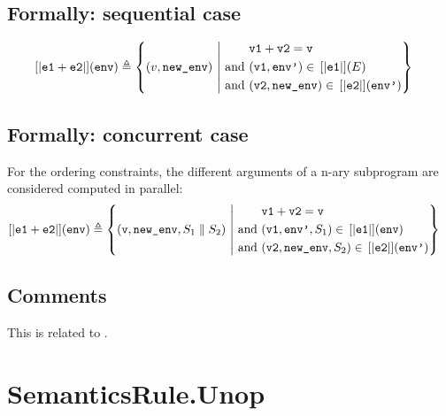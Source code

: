 \documentclass{book}
\begin{document}
\begin{formal}
  \subsection{Formally: sequential case}

  \begin{align}
  \left[| \texttt{e1} + \texttt{e2} \right|] (\texttt{env}) & \triangleq
    \left\{ (v, \texttt{new\_env}) \ \middle|\ {}
    \begin{aligned}
      & \texttt{v1} + \texttt{v2} = \texttt{v}
      \\ \text{and}\ &
      (\texttt{v1}, \texttt{env'}) \in{} \left[| \texttt{e1} \right|] (E)
      \\ \text{and}\ &
      (\texttt{v2}, \texttt{new\_env}) \in{} \left[| \texttt{e2} \right|] (\texttt{env'})
    \end{aligned}
    \right\}
  \label{eq:sem-seq-plus}
  \end{align}

  \subsection{Formally: concurrent case}
  For the ordering constraints, the different arguments of a n-ary subprogram
are considered computed in parallel:
  \begin{align}
    \left[| \texttt{e1} + \texttt{e2} \right|] (\texttt{env}) & \triangleq
    \left\{ (\texttt{v}, \texttt{new\_env}, S_1 \parallel S_2) \ \middle|\ {}
    \begin{aligned}
      & \texttt{v1} + \texttt{v2} = \texttt{v}
      \\ \text{and}\ &
      (\texttt{v1}, \texttt{env'}, S_1) \in{} \left[| \texttt{e1} \right|] (\texttt{env})
      \\ \text{and}\ &
      (\texttt{v2}, \texttt{new\_env}, S_2) \in{} \left[| \texttt{e2} \right|] (\texttt{env'})
    \end{aligned}
    \right\}
  \label{eq:sem-conc-plus}
  \end{align}
\end{formal}

\subsection{Comments}
  This is related to .

\section{SemanticsRule.Unop \label{sec:SemanticsRule.Unop}}
\end{document}
